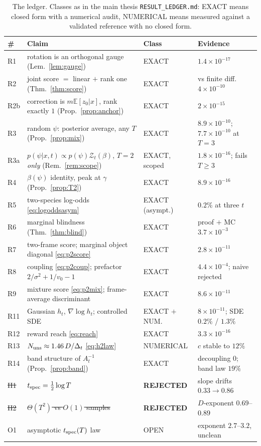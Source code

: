 \documentclass[11pt]{article}
\theoremstyle{plain}
\theoremstyle{remark}
\newcommand{\E}{\mathbb{E}}
\newcommand{\Z}{\mathcal{Z}}
\begin{document}
\begin{table}[h]\centering
\footnotesize
\setlength{\tabcolsep}{4pt}
\begin{tabular}{llll}
\toprule
\# & Claim & Class & Evidence \\
\midrule
R1  & rotation is an orthogonal gauge (Lem.~\ref{lem:gauge})    & EXACT & $1.4\times10^{-17}$\\
R2  & joint score $=$ linear $+$ rank one (Thm.~\ref{thm:score})& EXACT & vs finite diff.\ $4\times10^{-10}$\\
R2b & correction is $m\E[z_0|x]$, rank exactly $1$ (Prop.~\ref{prop:anchor}) & EXACT & $2\times10^{-15}$\\
R3  & random $\psi$: posterior average, any $T$ (Prop.~\ref{prop:mix}) & EXACT & $8.9{\times}10^{-10}$; $7.7{\times}10^{-10}$ at $T{=}3$\\
R3a & $p(\psi|x,t)\propto p(\psi)\Z_t(\beta)$, \emph{$T{=}2$ only} (Rem.~\ref{rem:scope}) & EXACT, scoped & $1.8{\times}10^{-16}$; fails $T{\ge}3$\\
R4  & $\beta(\psi)$ identity, peak at $\gamma$ (Prop.~\ref{prop:T2}) & EXACT & $8.9\times10^{-16}$\\
R5  & two-species log-odds \eqref{eq:logoddsasym} & EXACT (asympt.) & $0.2\%$ at three $t$\\
R6  & marginal blindness (Thm.~\ref{thm:blind}) & EXACT & proof $+$ MC $3.7\times10^{-3}$\\
R7  & two-frame score; marginal object diagonal \eqref{eq:p2score} & EXACT & $2.8\times10^{-11}$\\
R8  & coupling \eqref{eq:p2coup}; prefactor $2/\sigma^2{+}1/v_0{-}1$ & EXACT & $4.4\times10^{-4}$; naive rejected\\
R9  & mixture score \eqref{eq:p2mix}; frame-average discriminant & EXACT & $8.6\times10^{-11}$\\
R11 & Gaussian $h_t$, $\nabla\log h_t$; controlled SDE & EXACT $+$ NUM. & $8{\times}10^{-11}$; SDE $0.2\%$ / $1.3\%$\\
R12 & reward reach \eqref{eq:reach} & EXACT & $3.3\times10^{-16}$\\
R13 & $N_{\rm uns}\approx1.46\,D/\Delta_t$ \eqref{eq:h2law} & NUMERICAL & $c$ stable to $12\%$\\
R14 & band structure of $A_t^{-1}$ (Prop.~\ref{prop:band}) & EXACT & decoupling $0$; band law $19\%$\\
\midrule
\sout{H1} & \sout{$t_{\rm spec} = \tfrac12\log T$} & \textbf{REJECTED} & slope drifts $0.33\to0.86$\\
\sout{H2} & \sout{$\Theta(T^2)$ vs $O(1)$ samples} & \textbf{REJECTED} & $D$-exponent $0.69$--$0.89$\\
O1  & asymptotic $t_{\rm spec}(T)$ law & OPEN & exponent $2.7$--$3.2$, unclean\\
\bottomrule
\end{tabular}
\caption{The ledger. Classes as in the main thesis \texttt{RESULT\_LEDGER.md}:
EXACT means closed form with a numerical audit, NUMERICAL means measured against
a validated reference with no closed form.}
\label{tab:ledger}
\end{table}
\end{document}
